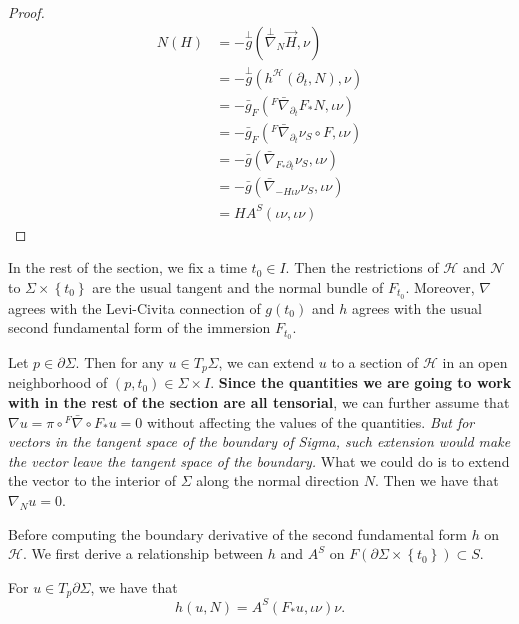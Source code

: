 \begin{proof}

    \begin{equation}
    \begin{split}
        N(H)
    &= - \overset{\perp }{g} (\overset{\perp }{\nabla} _{N}\vec{H}, \nu )\\
    &= - \overset{\perp }{g} (h^{\mathcal{H} }(\partial _t, N), \nu )\\
    &=- \bar{g}_F({}^F \bar{\nabla } _{\partial_t }F_*N, \iota \nu)\\
    &= - \bar{g}_F({}^F \bar{\nabla } _{\partial_t } \nu _S \circ F, \iota \nu)\\
    &= - \bar{g}(\bar{\nabla }_{F_* \partial_t} \nu _S,\iota \nu )\\
    &= - \bar{g}(\bar{\nabla }_{-H \iota \nu } \nu _S,\iota \nu )\\
    &= H A^S(\iota \nu , \iota \nu )
    \end{split}
    \end{equation}  
\end{proof}

In the rest of the section, we fix a time $t_0 \in I$. Then the restrictions of $\mathcal{H} $ and $\mathcal{N} $  to $\Sigma \times \left\{ t_0 \right\} $ are the usual tangent and the normal bundle of $F_{t_0}$. Moreover, $\nabla $ agrees with the Levi-Civita connection of $g(t_0)$ and $h$ agrees with the usual second fundamental form of the immersion $F_{t_0}$. 

Let $p \in \partial \Sigma $. Then for any $u \in T_p \Sigma $, we can extend $u$ to a section of $\mathcal{H} $ in an open neighborhood of $(p,t_0) \in \Sigma \times I$. \textbf{Since the quantities we are going to work with in the rest of the section are all tensorial}, we can further assume that $\nabla u = \pi \circ {}^F \bar{\nabla } \circ F_* u = 0$ without affecting the values of the quantities. \textit{But for vectors in the tangent space of the boundary of Sigma, such extension would make the vector leave the tangent space of the boundary.} What we could do is to extend the vector to the interior of $\Sigma $ along the normal direction $N$. Then we have that $\nabla _N u=0$.  

Before computing the boundary derivative of the second fundamental form $h$ on $\mathcal{H} $. We first derive a relationship between $h$ and $A^S$ on $F(\partial \Sigma \times \left\{ t_0 \right\} ) \subset S $.

\begin{lemma} \label{htoas}
    For $u \in T_p \partial \Sigma $, we have that 
    \[h(u,N)=A^S(F_{*}u, \iota \nu ) \nu. \] 
\end{lemma}


